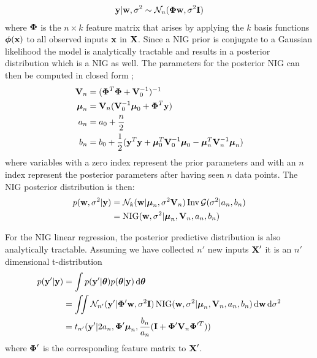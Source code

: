 \documentclass[../thesis.tex]{subfiles}
\begin{document}
\begin{equation}
    \begin{split}
    \boldsymbol{\mathbf{y}} | \boldsymbol{\mathbf{w}}, \sigma^2  \sim  \mathcal{N}_n (\boldsymbol{\mathbf{\Phi}} \boldsymbol{\mathbf{w}}, \sigma^2 \boldsymbol{\mathbf{I}}) 
    \end{split}
\end{equation}
where $\boldsymbol{\mathbf{\Phi}}$ is the $n \times k$ feature matrix that arises by applying the $k$ basis functions $\boldsymbol{\mathbf{\phi}}(\boldsymbol{\mathbf{x}})$ to all observed inputs $\boldsymbol{\mathbf{x}}$ in $\boldsymbol{\mathbf{X}}$. Since a NIG prior is conjugate to a Gaussian likelihood the model is analytically tractable and results in a posterior distribution which is a NIG as well. The parameters for the posterior NIG can then be computed in closed form \parencite{murphy2007conjugate}; \parencite[Chapter~14.2]{gelman2014bayesian}
\begin{equation}
    \begin{split}
        \boldsymbol{\mathbf{V}}_n &= (\boldsymbol{\mathbf{\Phi}}^T \boldsymbol{\mathbf{\Phi}} + \boldsymbol{\mathbf{V}}_0^{-1})^{-1} \\
        \boldsymbol{\mathbf{\mu}}_n &= \boldsymbol{\mathbf{V}}_n (\boldsymbol{\mathbf{V}}_0^{-1} \boldsymbol{\mathbf{\mu}}_0 + \boldsymbol{\mathbf{\Phi}}^T \boldsymbol{\mathbf{y}}) \\
        a_n &= a_0 + \frac{n}{2} \\
        b_n &= b_0 + \frac{1}{2} (\boldsymbol{\mathbf{y}}^T \boldsymbol{\mathbf{y}} + \boldsymbol{\mathbf{\mu}}_0^T \boldsymbol{\mathbf{V}}_0^{-1}\boldsymbol{\mathbf{\mu}}_0 - \boldsymbol{\mathbf{\mu}}_n^T \boldsymbol{\mathbf{V}}_n^{-1} \boldsymbol{\mathbf{\mu}}_n)
    \end{split}
\end{equation}
where variables with a zero index represent the prior parameters and with an $n$ index represent the posterior parameters after having seen $n$ data points. The NIG posterior distribution is then:
\begin{equation}
    \begin{split}
    p(\boldsymbol{\mathbf{w}}, \sigma^2 | \boldsymbol{\mathbf{y}}) &= \mathcal{N}_k(\boldsymbol{\mathbf{w}} | \boldsymbol{\mathbf{\mu}}_n, \sigma^2 \boldsymbol{\mathbf{V}}_n) \operatorname{Inv}\mathcal{G}(\sigma^2 | a_n, b_n)  \\  
    &= \operatorname{NIG}(\boldsymbol{\mathbf{w}}, \sigma^2 | \boldsymbol{\mathbf{\mu}}_n, \boldsymbol{\mathbf{V}}_n, a_n, b_n)
    \end{split}
\end{equation}

For the NIG linear regression, the posterior predictive distribution is also analytically tractable. Assuming we have collected $n'$ new inputs $\boldsymbol{\mathbf{X}}'$ it is an $n'$ dimensional t-distribution
\begin{equation}
    \begin{split}
        p(\boldsymbol{\mathbf{y}}' | \boldsymbol{\mathbf{y}}) &= \int p(\boldsymbol{\mathbf{y}}' | \boldsymbol{\mathbf{\theta}}) p(\boldsymbol{\mathbf{\theta}} | \boldsymbol{\mathbf{y}}) \mathop{}\!\mathrm{d}\boldsymbol{\mathbf{\theta}} \\
        &=  \iint \mathcal{N}_{n'} (\boldsymbol{\mathbf{y}}' | \boldsymbol{\mathbf{\Phi}}' \boldsymbol{\mathbf{w}}, \sigma^2 \boldsymbol{\mathbf{I}})  \operatorname{NIG}(\boldsymbol{\mathbf{w}}, \sigma^2 | \boldsymbol{\mathbf{\mu}}_n, \boldsymbol{\mathbf{V}}_n, a_n, b_n) \mathop{}\!\mathrm{d} \boldsymbol{\mathbf{w}} \mathop{}\!\mathrm{d}\sigma^2 \\
        &=  t_{n'}(\boldsymbol{\mathbf{y}}' | 2a_n, \boldsymbol{\mathbf{\Phi}}' \boldsymbol{\mathbf{\mu}}_n, \frac{b_n}{a_n} (\boldsymbol{\mathbf{I}} + \boldsymbol{\mathbf{\Phi}}' \boldsymbol{\mathbf{V}}_n \boldsymbol{\mathbf{\Phi}}^{\prime T}))
    \end{split}
\end{equation}
where $\boldsymbol{\mathbf{\Phi}}'$ is the corresponding feature matrix to $\boldsymbol{\mathbf{X}}'$. 
\end{document}
